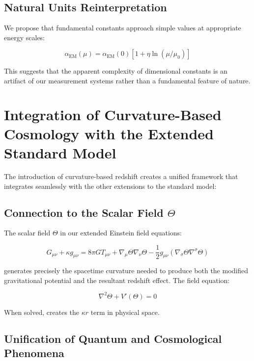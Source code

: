 \documentclass[12pt,a4paper]{article}
\begin{document}
	\subsection{Natural Units Reinterpretation}
	
	We propose that fundamental constants approach simple values at appropriate energy scales:
	
	\begin{equation}
		\alpha_{\text{EM}}(\mu) = \alpha_{\text{EM}}(0)[1 + \eta \ln(\mu/\mu_0)]
	\end{equation}
	
	This suggests that the apparent complexity of dimensional constants is an artifact of our measurement systems rather than a fundamental feature of nature.
	
	\section{Integration of Curvature-Based Cosmology with the Extended Standard Model}
	
	The introduction of curvature-based redshift creates a unified framework that integrates seamlessly with the other extensions to the standard model:
	
	\subsection{Connection to the Scalar Field $\Theta$}
	
	The scalar field $\Theta$ in our extended Einstein field equations:
	
	\begin{equation}
		G_{\mu\nu} + \kappa g_{\mu\nu} = 8\pi G T_{\mu\nu} + \nabla_{\mu}\Theta\nabla_{\nu}\Theta - \frac{1}{2}g_{\mu\nu}(\nabla_{\sigma}\Theta\nabla^{\sigma}\Theta)
	\end{equation}
	
	generates precisely the spacetime curvature needed to produce both the modified gravitational potential and the resultant redshift effect. The field equation:
	
	\begin{equation}
		\nabla^2\Theta + V'(\Theta) = 0
	\end{equation}
	
	When solved, creates the $\kappa r$ term in physical space.
	
	\subsection{Unification of Quantum and Cosmological Phenomena}
	
\end{document}
